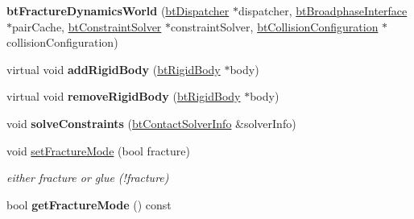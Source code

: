 \begin{DoxyCompactItemize}
\item 
\hypertarget{classbt_fracture_dynamics_world_a73bc1c14c37597ed32acbf95fd19ad89}{{\bfseries bt\+Fracture\+Dynamics\+World} (\hyperlink{classbt_dispatcher}{bt\+Dispatcher} $\ast$dispatcher, \hyperlink{classbt_broadphase_interface}{bt\+Broadphase\+Interface} $\ast$pair\+Cache, \hyperlink{classbt_constraint_solver}{bt\+Constraint\+Solver} $\ast$constraint\+Solver, \hyperlink{classbt_collision_configuration}{bt\+Collision\+Configuration} $\ast$collision\+Configuration)}\label{classbt_fracture_dynamics_world_a73bc1c14c37597ed32acbf95fd19ad89}

\item 
\hypertarget{classbt_fracture_dynamics_world_a5afb50ff2125a64fb902d8f839e97b62}{virtual void {\bfseries add\+Rigid\+Body} (\hyperlink{classbt_rigid_body}{bt\+Rigid\+Body} $\ast$body)}\label{classbt_fracture_dynamics_world_a5afb50ff2125a64fb902d8f839e97b62}

\item 
\hypertarget{classbt_fracture_dynamics_world_a5f53f422e5b4b6640c0202ffb1e7dbca}{virtual void {\bfseries remove\+Rigid\+Body} (\hyperlink{classbt_rigid_body}{bt\+Rigid\+Body} $\ast$body)}\label{classbt_fracture_dynamics_world_a5f53f422e5b4b6640c0202ffb1e7dbca}

\item 
\hypertarget{classbt_fracture_dynamics_world_a08785c7f23e9a18a31a1178804b26c69}{void {\bfseries solve\+Constraints} (\hyperlink{structbt_contact_solver_info}{bt\+Contact\+Solver\+Info} \&solver\+Info)}\label{classbt_fracture_dynamics_world_a08785c7f23e9a18a31a1178804b26c69}

\item 
\hypertarget{classbt_fracture_dynamics_world_ae5c5167fc97df9b76265437114cf5c0e}{void \hyperlink{classbt_fracture_dynamics_world_ae5c5167fc97df9b76265437114cf5c0e}{set\+Fracture\+Mode} (bool fracture)}\label{classbt_fracture_dynamics_world_ae5c5167fc97df9b76265437114cf5c0e}

\begin{DoxyCompactList}\small\item\em either fracture or glue (!fracture) \end{DoxyCompactList}\item 
\hypertarget{classbt_fracture_dynamics_world_a1a67cb7a030aca6ab0545d6d939f3792}{bool {\bfseries get\+Fracture\+Mode} () const }\label{classbt_fracture_dynamics_world_a1a67cb7a030aca6ab0545d6d939f3792}


\end{DoxyCompactItemize}
